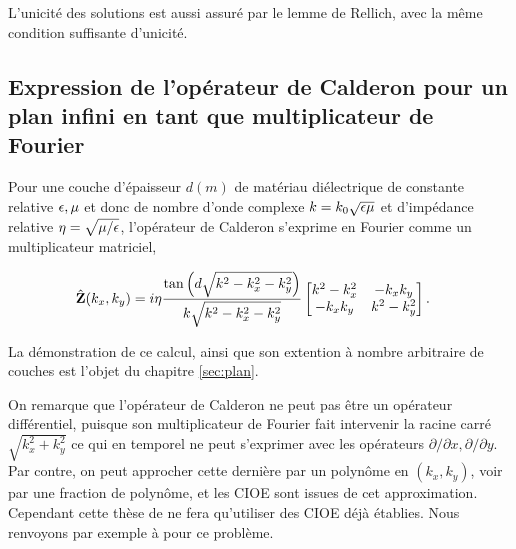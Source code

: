     L'unicité des solutions est aussi assuré par le lemme de Rellich, avec la même condition suffisante d'unicité.

    \subsection{Expression de l'opérateur de Calderon pour un plan infini en tant que multiplicateur de Fourier}


        Pour une couche d'épaisseur \(d (m)\) de matériau diélectrique de constante relative \(\epsilon,\mu\) et donc de nombre d'onde complexe \(k = k_0\sqrt{\epsilon\mu}\) et d'impédance relative \(\eta=\sqrt{{\mu}/{\epsilon}}\), l'opérateur de Calderon s'exprime en Fourier comme un multiplicateur matriciel,

        \begin{align*}
          \hat {\mathbf{Z}}(k_x,k_y) &= i\eta\dfrac{\tan\left(d\sqrt{k^2-k_x^2-k_y^2}\right)}{k \sqrt{k^2-k_x^2-k_y^2}}
          \begin{bmatrix}
            k^2-k_x^2  & -k_xk_y
            \\
            -k_xk_y & k^2-k_y^2
          \end{bmatrix}.
        \end{align*}

        La démonstration de ce calcul, ainsi que son extention à nombre arbitraire de couches est l'objet du chapitre \ref{sec:plan}.

        On remarque que l'opérateur de Calderon ne peut pas être un opérateur différentiel, puisque son multiplicateur de Fourier fait intervenir la racine carré \(\sqrt{k_x^2 + k_y^2}\) ce qui en temporel ne peut s'exprimer avec les opérateurs \(\partial/\partial x, \partial / \partial y\).
        Par contre, on peut approcher cette dernière par un polynôme en \((k_x,k_y)\), voir par une fraction de polynôme, et les CIOE sont issues de cet approximation.
        Cependant cette thèse de ne fera qu'utiliser des CIOE déjà établies.
        Nous renvoyons par exemple à \cite{senior_approximate_1995} pour ce problème.

